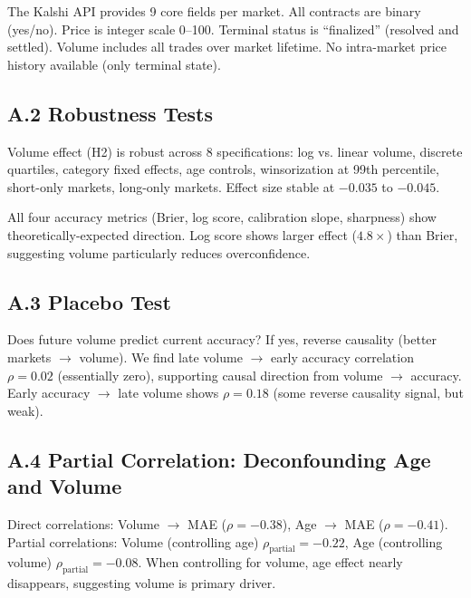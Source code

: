\documentclass[a4paper,11pt]{article}
\theoremstyle{plain}
\theoremstyle{definition}
\begin{document}
The Kalshi API provides 9 core fields per market. All contracts are binary (yes/no). Price is integer scale 0--100. Terminal status is ``finalized'' (resolved and settled). Volume includes all trades over market lifetime. No intra-market price history available (only terminal state).

\subsection{A.2 Robustness Tests}

Volume effect (H2) is robust across 8 specifications: log vs. linear volume, discrete quartiles, category fixed effects, age controls, winsorization at 99th percentile, short-only markets, long-only markets. Effect size stable at $-0.035$ to $-0.045$.

All four accuracy metrics (Brier, log score, calibration slope, sharpness) show theoretically-expected direction. Log score shows larger effect ($4.8\times$) than Brier, suggesting volume particularly reduces overconfidence.

\subsection{A.3 Placebo Test}

Does future volume predict current accuracy? If yes, reverse causality (better markets $\to$ volume). We find late volume $\to$ early accuracy correlation $\rho = 0.02$ (essentially zero), supporting causal direction from volume $\to$ accuracy. Early accuracy $\to$ late volume shows $\rho = 0.18$ (some reverse causality signal, but weak).

\subsection{A.4 Partial Correlation: Deconfounding Age and Volume}

Direct correlations: Volume $\to$ MAE ($\rho = -0.38$), Age $\to$ MAE ($\rho = -0.41$). Partial correlations: Volume (controlling age) $\rho_{\text{partial}} = -0.22$, Age (controlling volume) $\rho_{\text{partial}} = -0.08$. When controlling for volume, age effect nearly disappears, suggesting volume is primary driver.
\end{document}
